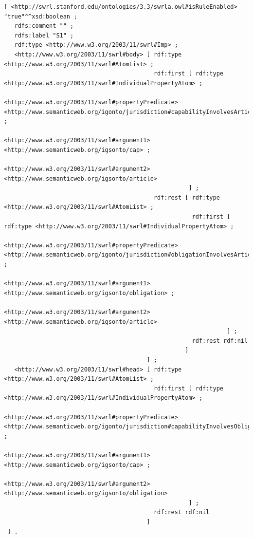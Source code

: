\documentclass[
  a4paper,  %
  twoside,  %
  bibliography=totoc,
  headsepline,
  cleardoublepage=empty,
  parskip=half,
  draft=false
]{scrbook}
\begin{document}
\begin{lstlisting}[style=turtle, caption={OWL translation \cite{SHACL}}]
[ <http://swrl.stanford.edu/ontologies/3.3/swrla.owl#isRuleEnabled> "true"^^xsd:boolean ;
   rdfs:comment "" ;
   rdfs:label "S1" ;
   rdf:type <http://www.w3.org/2003/11/swrl#Imp> ;
   <http://www.w3.org/2003/11/swrl#body> [ rdf:type <http://www.w3.org/2003/11/swrl#AtomList> ;
                                           rdf:first [ rdf:type <http://www.w3.org/2003/11/swrl#IndividualPropertyAtom> ;
                                                       <http://www.w3.org/2003/11/swrl#propertyPredicate> <http://www.semanticweb.org/igonto/jurisdiction#capabilityInvolvesArticle> ;
                                                       <http://www.w3.org/2003/11/swrl#argument1> <http://www.semanticweb.org/igsonto/cap> ;
                                                       <http://www.w3.org/2003/11/swrl#argument2> <http://www.semanticweb.org/igsonto/article>
                                                     ] ;
                                           rdf:rest [ rdf:type <http://www.w3.org/2003/11/swrl#AtomList> ;
                                                      rdf:first [ rdf:type <http://www.w3.org/2003/11/swrl#IndividualPropertyAtom> ;
                                                                  <http://www.w3.org/2003/11/swrl#propertyPredicate> <http://www.semanticweb.org/igonto/jurisdiction#obligationInvolvesArticle> ;
                                                                  <http://www.w3.org/2003/11/swrl#argument1> <http://www.semanticweb.org/igsonto/obligation> ;
                                                                  <http://www.w3.org/2003/11/swrl#argument2> <http://www.semanticweb.org/igsonto/article>
                                                                ] ;
                                                      rdf:rest rdf:nil
                                                    ]
                                         ] ;
   <http://www.w3.org/2003/11/swrl#head> [ rdf:type <http://www.w3.org/2003/11/swrl#AtomList> ;
                                           rdf:first [ rdf:type <http://www.w3.org/2003/11/swrl#IndividualPropertyAtom> ;
                                                       <http://www.w3.org/2003/11/swrl#propertyPredicate> <http://www.semanticweb.org/igonto/jurisdiction#capabilityInvolvesObligation> ;
                                                       <http://www.w3.org/2003/11/swrl#argument1> <http://www.semanticweb.org/igsonto/cap> ;
                                                       <http://www.w3.org/2003/11/swrl#argument2> <http://www.semanticweb.org/igsonto/obligation>
                                                     ] ;
                                           rdf:rest rdf:nil
                                         ]
 ] .

\end{lstlisting}\label{lst:shacl_shapes}
\end{document}
